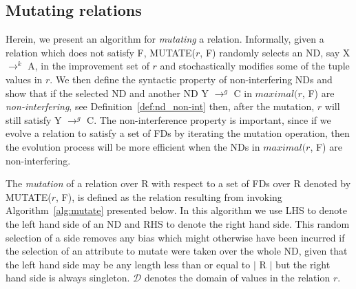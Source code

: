 \subsection{Mutating relations}
\label{sec:mutate}

Herein, we present an algorithm for {\em mutating} a relation.
Informally, given a relation which does not satisfy F, MUTATE($r$, F) 
randomly selects an ND, say X $\to^k$ A, in the improvement set of $r$ and 
stochastically modifies some of the tuple values in $r$.
We then define the syntactic property of non-interfering NDs 
and show that if the selected ND and another ND
Y $\to^g$ C in $maximal(r$, F) are {\em non-interfering}, see Definition~\ref{def:nd_non-int} then, after the mutation, 
$r$ will still satisfy Y $\to^g$ C.
The non-interference property is important,
since if we evolve a relation to satisfy a set of FDs by iterating the
mutation operation, then the evolution process will be more efficient 
when the NDs in $maximal(r$, F) are non-interfering.

\medskip

The {\em mutation} of a relation over R with respect to a set of FDs over R 
denoted by MUTATE($r$, F), is defined as the relation resulting from invoking 
Algorithm~\ref{alg:mutate} presented below. In this algorithm we use LHS
 to denote the left hand side of an ND and RHS to denote the right hand
side.  This random selection of a side removes any bias which might otherwise
have been incurred if the selection of an attribute to mutate were
taken over the whole ND, given that the left hand side may be any
length less than or equal to $\mid$ R $\mid$ but the right hand side is
always singleton. $\mathcal{D}$ denotes the domain of values in the
relation $r$.


